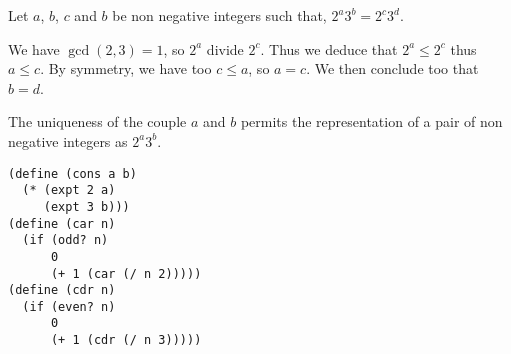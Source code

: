 \documentclass[a4paper,12pt]{article}
\begin{document}
Let $a$, $b$, $c$ and $b$ be non negative integers such that,
$ 2^a 3^b = 2^c 3^d$.

\medskip
We have $\gcd(2, 3) = 1$, so $2^a$ divide $2^c$.  Thus we deduce that
$2^a \le 2^c$ thus $a \le c$.  By symmetry, we have too $c \le a$, so
$a = c$.  We then conclude too that $b = d$.

The uniqueness of the couple $a$ and $b$ permits the representation of
a pair of non negative integers as $2^a 3^b$.
\begin{lstlisting}
(define (cons a b)
  (* (expt 2 a)
     (expt 3 b)))
(define (car n)
  (if (odd? n)
      0
      (+ 1 (car (/ n 2)))))
(define (cdr n)
  (if (even? n)
      0
      (+ 1 (cdr (/ n 3)))))
\end{lstlisting}
\end{document}
